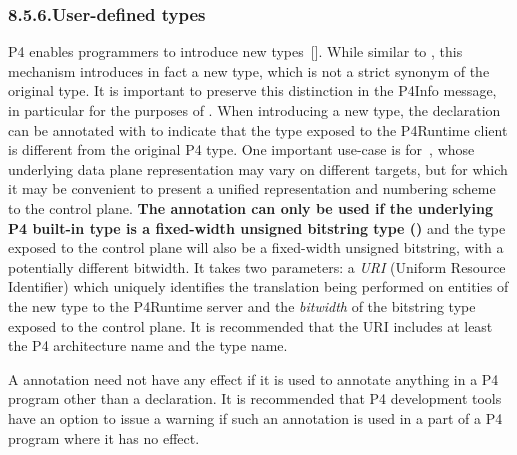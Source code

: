\documentclass[11pt]{article}
\begin{document}
{%
\subsubsection{8.5.6.\hspace*{0.5em}User-defined types}\label{sec-user-defined-types}%

\noindent{}P4 enables programmers to introduce new types~[]. While similar
to , this mechanism introduces in fact a new type, which is not a
strict synonym of the original type. It is important to preserve this
distinction in the P4Info message, in particular for the purposes of
. When introducing a new type, the
declaration can be annotated with  to indicate that the
type exposed to the P4Runtime client is different from the original P4 type. One
important use-case is for~,
whose underlying data plane representation may vary on different targets, but
for which it may be convenient to present a unified representation and numbering
scheme to the control plane. \textbf{The  annotation can only
be used if the underlying P4 built-in type is a fixed-width unsigned bitstring
type ()} and the type exposed to the control plane will also be a
fixed-width unsigned bitstring, with a potentially different bitwidth. It takes
two parameters: a \emph{URI} (Uniform Resource Identifier) which uniquely identifies
the translation being performed on entities of the new type to the P4Runtime
server and the \emph{bitwidth} of the bitstring type exposed to the control plane. It
is recommended that the URI includes at least the P4 architecture name and the
type name.%

A  annotation need not have any effect if it is used to
annotate anything in a P4 program other than a  declaration. It is
recommended that P4 development tools have an option to issue a warning if such
an annotation is used in a part of a P4 program where it has no effect.%

}
\end{document}
